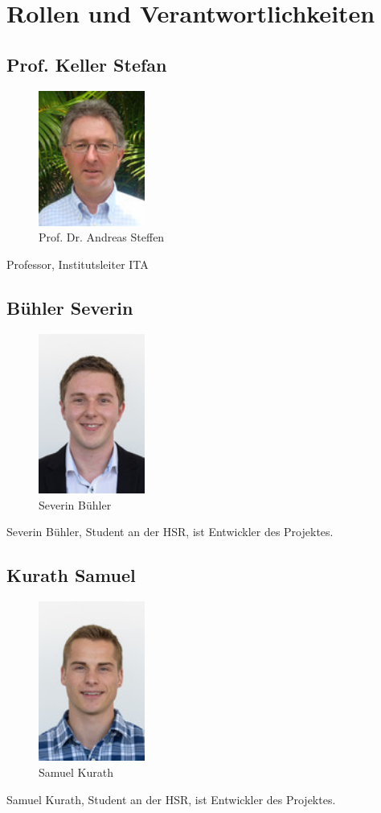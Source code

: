 \section{Rollen und Verantwortlichkeiten}
\subsection{Prof. Keller Stefan}
\begin{figure}[H]
	\centering
	\includegraphics[width=35mm]{images/asteffen.jpg}
	\caption{Prof. Dr. Andreas Steffen}
\end{figure}
Professor, Institutsleiter ITA

\subsection{Bühler Severin}
\begin{figure}[H]
	\centering
	\includegraphics[width=35mm]{images/sbuehler.jpg}
	\caption{Severin Bühler}
\end{figure}
Severin Bühler, Student an der HSR, ist Entwickler des Projektes.
\newpage
\subsection{Kurath Samuel}
\begin{figure}[H]
	\centering
	\includegraphics[width=35mm]{images/skurath.jpg}
	\caption{Samuel Kurath}
\end{figure}
Samuel Kurath, Student an der HSR, ist Entwickler des Projektes.
